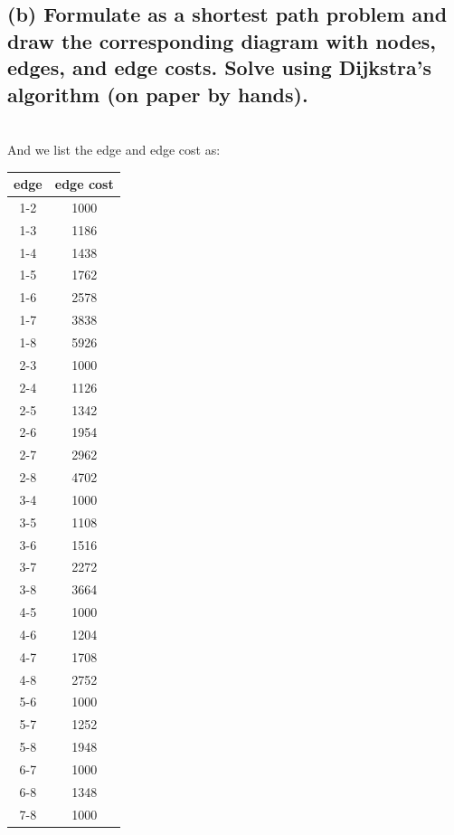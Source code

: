 \documentclass[a4paper,12pt]{journal}
\begin{document}
	\subsection*{(b) Formulate as a shortest path problem and draw the corresponding diagram with nodes, edges, and edge costs. Solve using Dijkstra’s algorithm (on paper by hands).}
	\\
	And we list the edge and edge cost as:\\
	\begin{center}
		\begin{tabular}{c c}
			edge&edge cost\\
			\hline
			1-2&1000\\
			1-3&1186\\
			1-4&1438\\
			1-5&1762\\
			1-6&2578\\
			1-7&3838\\
			1-8&5926\\
			2-3&1000\\
			2-4&1126\\
			2-5&1342\\
			2-6&1954\\
			2-7&2962\\
			2-8&4702\\
			3-4&1000\\
			3-5&1108\\
			3-6&1516\\
			3-7&2272\\
			3-8&3664\\
			4-5&1000\\
			4-6&1204\\
			4-7&1708\\
			4-8&2752\\
			5-6&1000\\
			5-7&1252\\
			5-8&1948\\
			6-7&1000\\
			6-8&1348\\
			7-8&1000\\
		\end{tabular}
	\end{center}
\end{document}

